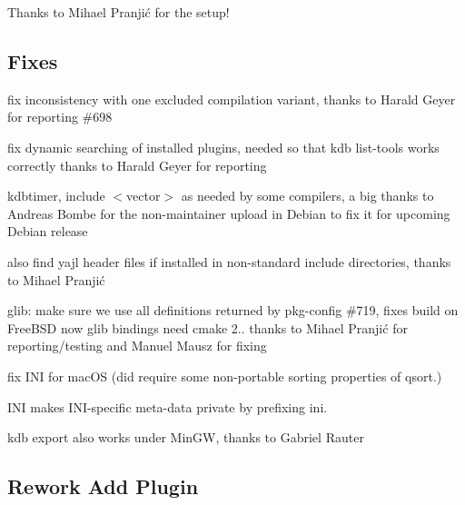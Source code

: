 Thanks to Mihael Pranjić for the setup!

\subsection*{Fixes}


\begin{DoxyItemize}
\item fix inconsistency with one excluded compilation variant, thanks to Harald Geyer for reporting \#698
\item fix dynamic searching of installed plugins, needed so that kdb list-\/tools works correctly thanks to Harald Geyer for reporting
\item kdbtimer, {\ttfamily include $<$vector$>$} as needed by some compilers, a big thanks to Andreas Bombe for the non-\/maintainer upload in Debian to fix it for upcoming Debian release
\item also find yajl header files if installed in non-\/standard include directories, thanks to Mihael Pranjić
\item glib\+: make sure we use all definitions returned by pkg-\/config \#719, fixes build on Free\+B\+SD now glib bindings need cmake 2.. thanks to Mihael Pranjić for reporting/testing and Manuel Mausz for fixing
\item fix I\+NI for mac\+OS (did require some non-\/portable sorting properties of {\ttfamily qsort}.)
\item I\+NI makes I\+N\+I-\/specific meta-\/data private by prefixing {\ttfamily ini}.
\item {\ttfamily kdb export} also works under Min\+GW, thanks to Gabriel Rauter
\end{DoxyItemize}

\subsection*{Rework Add Plugin}


